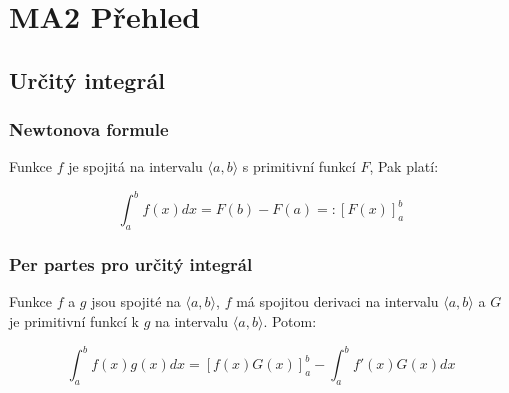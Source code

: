 \documentclass[a4paper]{article}
\begin{document}
\section*{MA2 Přehled}
\subsection*{Určitý integrál}

\subsubsection*{Newtonova formule}

Funkce $f$ je spojitá na intervalu $\langle a, b \rangle$ s primitivní funkcí $F$, Pak platí: 

\[ \int_a^b f(x) dx = F(b) - F(a) =:\left[ F(x) \right]_a^b \]

\subsubsection*{Per partes pro určitý integrál}

Funkce $f$ a $g$ jsou spojité na $\langle a, b \rangle$, $f$ má spojitou derivaci na intervalu $\langle a, b \rangle$ a $G$ je primitivní funkcí k $g$ na intervalu $\langle a, b \rangle$. Potom:

\[ \int_a^b f(x)g(x) dx =  \left[ f(x)G(x) \right]_a^b - \int_a^b f'(x)G(x) dx\]
\end{document}
